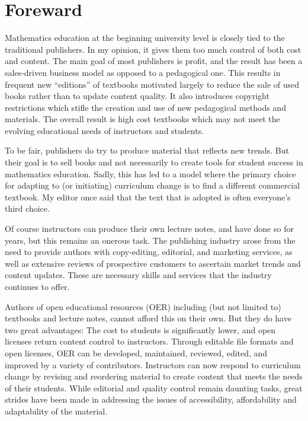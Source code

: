 \chapter*{Foreward}
\label{chap:foreward}

Mathematics education at the beginning university level is closely tied to the traditional publishers. In my opinion, it gives them too much control of both cost and content. The main goal of most publishers is profit, and the result has been a sales-driven business model as opposed to a pedagogical one. This results in frequent new ``editions'' of textbooks motivated largely to reduce the sale of used books rather than to update content quality. It also introduces copyright restrictions which stifle the creation and use of new pedagogical methods and materials. The overall result is high cost textbooks which may not meet the evolving educational needs of instructors and students.

To be fair, publishers do try to produce material that reflects new trends. But their goal is to sell books and not necessarily to create tools for student success in mathematics education. Sadly, this has led to a model where the primary choice for adapting to (or initiating) curriculum change is to find a different commercial textbook. My editor once said that the text that is adopted is often everyone's third choice.

Of course instructors can produce their own lecture notes, and have done so for years,
but this remains an onerous task. The publishing industry arose from the need to provide
authors with copy-editing, editorial, and marketing services, as well as extensive reviews of prospective customers to ascertain market trends and content updates. These are necessary skills and services that the industry continues to offer. 

Authors of open educational resources (OER) including (but not limited to) textbooks
and lecture notes, cannot afford this on their own. But they do have two great advantages: The cost to students is significantly lower, and open licenses return content control to instructors. Through editable file formats and open licenses, OER can be developed, maintained, reviewed, edited, and improved by a variety of contributors. Instructors can now respond to curriculum change by revising and reordering material to create content that meets the needs of their students. While editorial and quality control remain daunting tasks, great strides have been made in addressing the issues of accessibility, affordability
and adaptability of the material.


